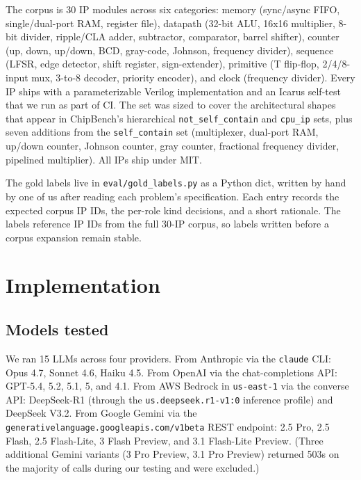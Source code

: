 \documentclass[conference]{IEEEtran}
\begin{document}
The corpus is 30 IP modules across six categories: memory (sync/async FIFO, single/dual-port RAM, register file), datapath (32-bit ALU, 16x16 multiplier, 8-bit divider, ripple/CLA adder, subtractor, comparator, barrel shifter), counter (up, down, up/down, BCD, gray-code, Johnson, frequency divider), sequence (LFSR, edge detector, shift register, sign-extender), primitive (T flip-flop, 2/4/8-input mux, 3-to-8 decoder, priority encoder), and clock (frequency divider). Every IP ships with a parameterizable Verilog implementation and an Icarus self-test that we run as part of CI. The set was sized to cover the architectural shapes that appear in ChipBench's hierarchical \texttt{not\_self\_contain} and \texttt{cpu\_ip} sets, plus seven additions from the \texttt{self\_contain} set (multiplexer, dual-port RAM, up/down counter, Johnson counter, gray counter, fractional frequency divider, pipelined multiplier). All IPs ship under MIT.

The gold labels live in \texttt{eval/gold\_labels.py} as a Python dict, written by hand by one of us after reading each problem's specification. Each entry records the expected corpus IP IDs, the per-role kind decisions, and a short rationale. The labels reference IP IDs from the full 30-IP corpus, so labels written before a corpus expansion remain stable.

\section{Implementation}

\subsection{Models tested}

We ran 15 LLMs across four providers. From Anthropic via the \texttt{claude} CLI: Opus 4.7, Sonnet 4.6, Haiku 4.5. From OpenAI via the chat-completions API: GPT-5.4, 5.2, 5.1, 5, and 4.1. From AWS Bedrock in \texttt{us-east-1} via the converse API: DeepSeek-R1 (through the \texttt{us.deepseek.r1-v1:0} inference profile) and DeepSeek V3.2. From Google Gemini via the \texttt{generativelanguage.googleapis.com/v1beta} REST endpoint: 2.5 Pro, 2.5 Flash, 2.5 Flash-Lite, 3 Flash Preview, and 3.1 Flash-Lite Preview. (Three additional Gemini variants (3 Pro Preview, 3.1 Pro Preview) returned 503s on the majority of calls during our testing and were excluded.)
\end{document}
